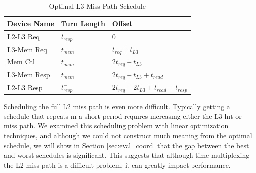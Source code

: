 \begin{table}
    \caption{Optimal L3 Miss Path Schedule}
    \centering
    \begin{tabular}{|r|r|l|l|}
        \hline
        \multicolumn{2}{|l|}{Device Name} & Turn Length & Offset\\\hline
        \multicolumn{2}{|l|}{L2-L3 Req}   & $t_{resp}^+$  & 0\\\hline
        \multicolumn{2}{|l|}{L3-Mem Req}  & $t_{mem}$ & $t_{req}+t_{L3}$\\\hline
        \multicolumn{2}{|l|}{Mem Ctl}     & $t_{mem}$ & $2t_{req}+t_{L3}$\\\hline
        \multicolumn{2}{|l|}{L3-Mem Resp} & $t_{mem}$ & 
          $2t_{req}+t_{L3}+t_{read}$\\\hline
        \multicolumn{2}{|l|}{L2-L3 Resp}  & $t_{resp}^+$ &
          $2t_{req}+2t_{L3}+t_{read}+t_{resp}$\\\hline
    \end{tabular}
    \label{tab:config}
\end{table}



Scheduling the full L2 miss path is even more difficult. Typically getting a 
schedule that repeats in a short period requires increasing either the L3 hit
or miss path. We examined this scheduling problem with linear optimization 
techniques, and although we could not construct much meaning from the optimal 
schedule, we will show in Section \ref{sec:eval_coord} that the gap between
the best and worst schedules is significant. This suggests that although time 
multiplexing the L2 miss path is a difficult problem, it can greatly impact 
performance.
